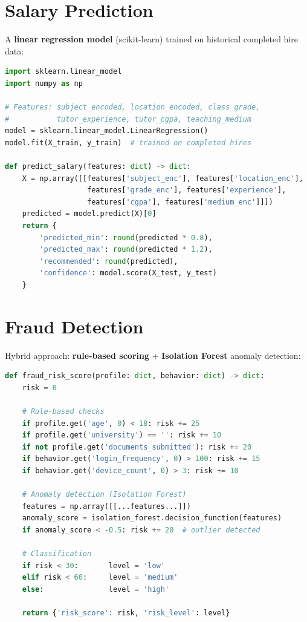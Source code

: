 \documentclass[12pt,a4paper,twoside]{report}
\begin{document}
\section{Salary Prediction}

A \textbf{linear regression model} (scikit-learn) trained on historical completed hire data:

\begin{lstlisting}[style=code, language=Python, caption={Salary Prediction Model}]
import sklearn.linear_model
import numpy as np

# Features: subject_encoded, location_encoded, class_grade,
#           tutor_experience, tutor_cgpa, teaching_medium
model = sklearn.linear_model.LinearRegression()
model.fit(X_train, y_train)  # trained on completed hires

def predict_salary(features: dict) -> dict:
    X = np.array([[features['subject_enc'], features['location_enc'],
                   features['grade_enc'], features['experience'],
                   features['cgpa'], features['medium_enc']]])
    predicted = model.predict(X)[0]
    return {
        'predicted_min': round(predicted * 0.8),
        'predicted_max': round(predicted * 1.2),
        'recommended': round(predicted),
        'confidence': model.score(X_test, y_test)
    }
\end{lstlisting}

\section{Fraud Detection}

Hybrid approach: \textbf{rule-based scoring} + \textbf{Isolation Forest} anomaly detection:

\begin{lstlisting}[style=code, language=Python, caption={Fraud Risk Score Calculation}]
def fraud_risk_score(profile: dict, behavior: dict) -> dict:
    risk = 0
    
    # Rule-based checks
    if profile.get('age', 0) < 18: risk += 25
    if profile.get('university') == '': risk += 10
    if not profile.get('documents_submitted'): risk += 20
    if behavior.get('login_frequency', 0) > 100: risk += 15
    if behavior.get('device_count', 0) > 3: risk += 10
    
    # Anomaly detection (Isolation Forest)
    features = np.array([[...features...]])
    anomaly_score = isolation_forest.decision_function(features)
    if anomaly_score < -0.5: risk += 20  # outlier detected
    
    # Classification
    if risk < 30:       level = 'low'
    elif risk < 60:     level = 'medium'
    else:               level = 'high'
    
    return {'risk_score': risk, 'risk_level': level}
\end{lstlisting}
\end{document}
